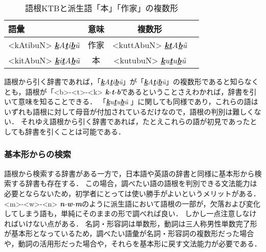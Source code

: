 \documentclass[technicalreport]{ieicej}
\begin{document}
\begin{table}[ht]
\begin{center}
\begin{tabular}{l|ccc}
   語彙 & 意味 & 複数形\\
  \hline
  <kAtibuN> \textit{\underline{\textbf{k}}A\underline{\textbf{t}}i\underline{\textbf{b}}\~u} & 作家 & <kuttAbuN> \textit{\underline{\textbf{k}}\underline{\textbf{t}}A\underline{\textbf{b}}\~u} \\
  <kitAbuN> \textit{\underline{\textbf{k}}i\underline{\textbf{t}}A\underline{\textbf{b}}\~u} & 本 & <kutubuN>  \textit{\underline{\textbf{k}}u\underline{\textbf{t}}u\underline{\textbf{b}}\~u} \\
\hline
\end{tabular}
\caption{語根KTBと派生語「本」「作家」の複数形}
\label{table:alignment}
\end{center}
\end{table}

語根から引く辞書であれば，「\textit{\underline{\textbf{k}}A\underline{\textbf{t}}i\underline{\textbf{b}}\~u}」が「\textit{\underline{\textbf{k}}A\underline{\textbf{t}}i\underline{\textbf{b}}\~u}」の複数形であると知らなくとも，語根が「<b>-<t>-<k> \textit{\textbf{k}-\textbf{t}-\textbf{b}}であるということさえわかれば，辞書を引いて意味を知ることできる．
「\textit{\underline{\textbf{k}}u\underline{\textbf{t}}u\underline{\textbf{b}}\~u} 」に関しても同様であり，これらの語はいずれも語根に対して母音が付加されているだけなので，語根の判別は難しくない．
それゆえ語根から引く辞書であれば，たとえこれらの語が初見であったとしても辞書を引くことは可能である．

\subsubsection{基本形からの検索}
語根から検索する辞書がある一方で，日本語や英語の辞書と同様に基本形から検索する辞書も存在する．
この場合，調べたい語の語根を判別できる文法能力は必要とならないため，初学者にとっては使い勝手がよいというメリットがある．
<m>-<w>-<n> \textit{\textbf{n}-\textbf{w}-\textbf{m}}のように派生語において語根の一部が，欠落および変化してしまう語も，単純にそのままの形で調べれば良い．
しかし一点注意しなければいけない点がある．
名詞・形容詞は単数形，動詞は三人称男性単数完了形が基本形となっているため，調べたい語彙が名詞・形容詞の複数形だった場合や，動詞の活用形だった場合や，それらを基本形に戻す文法能力が必要である．
\end{document}
